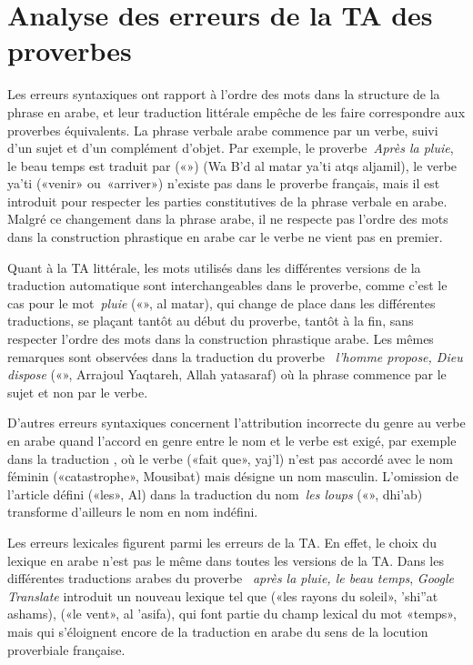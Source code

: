 \documentclass[french]{textolivre}
\begin{document}
\section{Analyse des erreurs de la TA des proverbes}\label{sec-organizacao}
Les erreurs syntaxiques ont rapport à l’ordre des mots dans la structure de la phrase en arabe, 
et leur traduction littérale empêche de les faire correspondre aux proverbes équivalents. 
La phrase verbale arabe commence par un verbe, suivi d’un sujet et d’un complément d’objet. 
Par exemple, le proverbe \textit{Après la pluie}, le beau temps est traduit par («») 
(Wa B'd al matar ya'ti atqs aljamil), le verbe  ya'ti («venir» ou «arriver») 
n’existe pas dans le proverbe français, mais il est introduit pour respecter les parties constitutives de la phrase verbale en arabe. 
Malgré ce changement dans la phrase arabe, il ne respecte pas l’ordre des mots dans la construction phrastique en arabe car le verbe ne vient pas en premier. 

Quant à la TA littérale, les mots utilisés dans les différentes versions de la traduction automatique 
sont interchangeables dans le proverbe, comme c’est le cas pour le mot \textit{pluie} 
(«», al matar), qui change de place dans les différentes traductions, 
se plaçant tantôt au début du proverbe, tantôt à la fin, sans respecter l’ordre des mots dans 
la construction phrastique arabe. Les mêmes remarques sont observées dans la traduction du proverbe 
\textit{l’homme propose, Dieu dispose} («», 
Arrajoul Yaqtareh, Allah yatasaraf) où la phrase commence par le sujet et non par le verbe. 

D’autres erreurs syntaxiques concernent l’attribution incorrecte du genre au verbe en arabe quand 
l’accord en genre entre le nom et le verbe est exigé, par exemple dans la traduction , 
où le verbe  («fait que», yaj'l) n’est pas accordé avec le nom féminin  
(«catastrophe», Mousibat) mais désigne un nom masculin. L’omission de l’article défini  («les», Al) 
dans la traduction du nom \textit{les loups} («», dhi'ab) transforme d’ailleurs le nom en nom indéfini.

Les erreurs lexicales figurent parmi les erreurs de la TA. En effet, le choix du lexique en arabe n’est pas 
le même dans toutes les versions de la TA. Dans les différentes traductions arabes du proverbe 
\textit{après la pluie, le beau temps}, \textit{Google Translate} introduit un nouveau lexique tel que 
 («les rayons du soleil», 'shi''at ashams),  
(«le vent», al 'asifa), qui font partie du champ lexical du mot «temps», mais qui s’éloignent encore de 
la traduction en arabe du sens de la locution proverbiale française.
\end{document}
